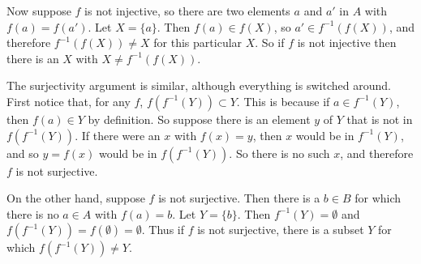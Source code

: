\documentclass[
]{article}
\begin{document}
Now suppose \(f\) is not injective, so there are two elements \(a\) and
\(a'\) in \(A\) with \(f(a)=f(a')\). Let \(X=\{a\}\). Then
\(f(a)\in f(X)\), so \(a'\in f^{-1}(f(X))\), and therefore
\(f^{-1}(f(X))\not=X\) for this particular \(X\). So if \(f\) is not
injective then there is an \(X\) with \(X\not=f^{-1}(f(X))\).

The surjectivity argument is similar, although everything is switched
around. First notice that, for any \(f\), \(f(f^{-1}(Y))\subset Y\).
This is because if \(a\in f^{-1}(Y)\), then \(f(a)\in Y\) by definition.
So suppose there is an element \(y\) of \(Y\) that is not in
\(f(f^{-1}(Y))\). If there were an \(x\) with \(f(x)=y\), then \(x\)
would be in \(f^{-1}(Y)\), and so \(y=f(x)\) would be in
\(f(f^{-1}(Y))\). So there is no such \(x\), and therefore \(f\) is not
surjective.

On the other hand, suppose \(f\) is not surjective. Then there is a
\(b\in B\) for which there is no \(a\in A\) with \(f(a)=b\). Let
\(Y=\{b\}\). Then \(f^{-1}(Y)=\emptyset\) and
\(f(f^{-1}(Y))=f(\emptyset)=\emptyset\). Thus if \(f\) is not
surjective, there is a subset \(Y\) for which \(f(f^{-1}(Y))\not=Y\).
\end{document}
